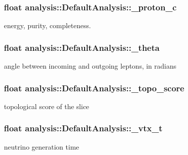 \subsubsection[{\texorpdfstring{\+\_\+proton\+\_\+c}{_proton_c}}]{\setlength{\rightskip}{0pt plus 5cm}float analysis\+::\+Default\+Analysis\+::\+\_\+proton\+\_\+c\hspace{0.3cm}{\ttfamily [private]}}\hypertarget{classanalysis_1_1DefaultAnalysis_a643cc086bdfa4332ced72f6d4e5ce233}{}\label{classanalysis_1_1DefaultAnalysis_a643cc086bdfa4332ced72f6d4e5ce233}
energy, purity, completeness. 
\subsubsection[{\texorpdfstring{\+\_\+theta}{_theta}}]{\setlength{\rightskip}{0pt plus 5cm}float analysis\+::\+Default\+Analysis\+::\+\_\+theta\hspace{0.3cm}{\ttfamily [private]}}\hypertarget{classanalysis_1_1DefaultAnalysis_adb169ccacccada1a17b6699a25f3fd67}{}\label{classanalysis_1_1DefaultAnalysis_adb169ccacccada1a17b6699a25f3fd67}
angle between incoming and outgoing leptons, in radians 
\subsubsection[{\texorpdfstring{\+\_\+topo\+\_\+score}{_topo_score}}]{\setlength{\rightskip}{0pt plus 5cm}float analysis\+::\+Default\+Analysis\+::\+\_\+topo\+\_\+score\hspace{0.3cm}{\ttfamily [private]}}\hypertarget{classanalysis_1_1DefaultAnalysis_a950efb6f4e8f1ad6dd00e24bc74002c2}{}\label{classanalysis_1_1DefaultAnalysis_a950efb6f4e8f1ad6dd00e24bc74002c2}
topological score of the slice 
\subsubsection[{\texorpdfstring{\+\_\+vtx\+\_\+t}{_vtx_t}}]{\setlength{\rightskip}{0pt plus 5cm}float analysis\+::\+Default\+Analysis\+::\+\_\+vtx\+\_\+t\hspace{0.3cm}{\ttfamily [private]}}\hypertarget{classanalysis_1_1DefaultAnalysis_a39b0367db015ffa41fc4663cb5aeb242}{}\label{classanalysis_1_1DefaultAnalysis_a39b0367db015ffa41fc4663cb5aeb242}
neutrino generation time 

